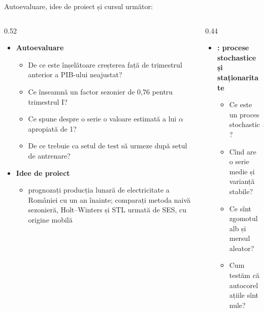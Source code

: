 \begin{frame}{Autoevaluare, idee de proiect și cursul următor: }
\itemsize{\footnotesize}
\begin{columns}[T]
\begin{column}{0.52\textwidth}
\begin{itemize}
    \item \textbf{Autoevaluare}
    \begin{itemize}
        \item De ce este înșelătoare creșterea față de trimestrul anterior a PIB-ului neajustat?
        \item Ce înseamnă un factor sezonier de 0,76 pentru trimestrul I?
        \item Ce spune despre o serie o valoare estimată a lui $\alpha$ apropiată de 1?
        \item De ce trebuie ca setul de test să urmeze după setul de antrenare?
    \end{itemize}
    \item \textbf{Idee de proiect}
    \begin{itemize}
        \item prognozați producția lunară de electricitate a României cu un an înainte; comparați metoda naivă sezonieră, Holt--Winters și STL urmată de SES, cu origine mobilă
    \end{itemize}
\end{itemize}
\end{column}
\begin{column}{0.44\textwidth}
\begin{itemize}
    \item \textbf{: procese stochastice și staționaritate}
    \begin{itemize}
        \item Ce este un proces stochastic?
        \item Cînd are o serie medie și varianță stabile?
        \item Ce sînt zgomotul alb și mersul aleator?
        \item Cum testăm că autocorelațiile sînt nule?
    \end{itemize}
\end{itemize}
\end{column}
\end{columns}
\end{frame}


